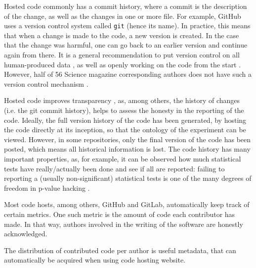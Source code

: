 Hosted code commonly has a commit history,
where a commit is the description of the change, 
as well as the changes in one or more file.
For example, GitHub
uses a version control system called \verb|git| (hence its name).
In practice, this means that when a change is made to the code,
a new version is created. In the case that the change was harmful,
one can go back to an earlier version and continue again from there.
It is a general recommendation to put version control
on all human-produced data \cite{wilson2014best},
as well as openly working on the code from the start \cite{jimenez2017four}.
However, half of 56 Science magazine corresponding authors 
does not have such a version control mechanism \cite{stodden2018empirical}.


Hosted code improves transparency \cite{gorgolewski2016practical},
as, among others, the history of changes (i.e. the git commit history), 
helps to assess the honesty in the reporting of the code. 
Ideally, the full version history of the code 
has been generated, by hosting the code directly at its inception,
so that the ontology of the experiment can be viewed.
However, in some repositories, only the final version of the code has been
posted, which means all historical information is lost.
The code history has many important properties,
as, for example, 
it can be observed how much statistical tests have really/actually been done 
and see if all are reported:
failing to reporting a (usually non-significant) statistical tests is 
one of the many degrees of freedom 
in p-value hacking \cite{wicherts2016degrees}.


Most code hosts, among others, GitHub and GitLab,
automatically keep track of certain metrics.
One such metric is the amount of code each contributor has made.
In that way, authors involved in the writing of the software
are honestly acknowledged. 

The distribution of contributed code per author 
is useful metadata, that can automatically
be acquired when using code hosting website.

